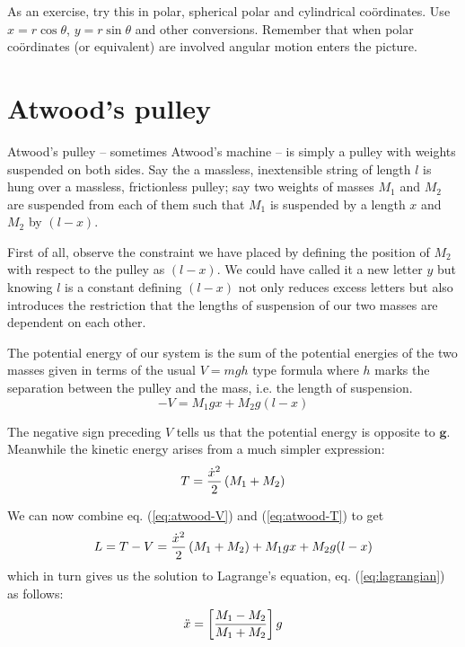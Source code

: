 \documentclass[english,seminar,headertitle]{lecture}
\begin{document}
As an exercise, try this in polar, spherical polar and cylindrical co\"{o}rdinates. Use $x=r\cos\theta$, $y=r\sin\theta$ and other conversions. Remember that when polar co\"{o}rdinates (or equivalent) are involved angular motion enters the picture.

\section{Atwood's pulley}

Atwood's pulley -- sometimes Atwood's machine -- is simply a pulley with weights suspended on both sides. Say the a massless, inextensible string of length $l$ is hung over a massless, frictionless pulley; say two weights of masses $M_1$ and $M_2$ are suspended from each of them such that $M_1$ is suspended by a length $x$ and $M_2$ by $(l-x)$.

First of all, observe the constraint we have placed by defining the position of $M_2$ with respect to the pulley as $(l-x)$. We could have called it a new letter $y$ but knowing $l$ is a constant defining $(l-x)$ not only reduces excess letters but also introduces the restriction that the lengths of suspension of our two masses are dependent on each other.

The potential energy of our system is the sum of the potential energies of the two masses given in terms of the usual $V = mgh$ type formula where $h$ marks the separation between the pulley and the mass, i.e. the length of suspension.
\begin{equation}
-V = M_1 g x + M_2 g (l-x)
\label{eq:atwood-V}
\end{equation}%

The negative sign preceding $V$ tells us that the potential energy is opposite to $\mathbf{g}$. Meanwhile the kinetic energy arises from a much simpler expression:
\begin{equation}
	T = {\dot{x}^2 \over 2} \left( M_1 + M_2 \right)
	\label{eq:atwood-T}
\end{equation}%

We can now combine eq. (\ref{eq:atwood-V}) and (\ref{eq:atwood-T}) to get
$$
L = T-V = {\dot{x}^2 \over 2} \left( M_1 + M_2 \right) + M_1 g x + M_2 g (l-x)
$$
which in turn gives us the solution to Lagrange's equation, eq. (\ref{eq:lagrangian}) as follows:
\begin{equation}
	\ddot{x} = \left[ { M_1 - M_2 \over M_1 + M_2 } \right] g
	\label{eq:atwood-result}
\end{equation}%
\end{document}
